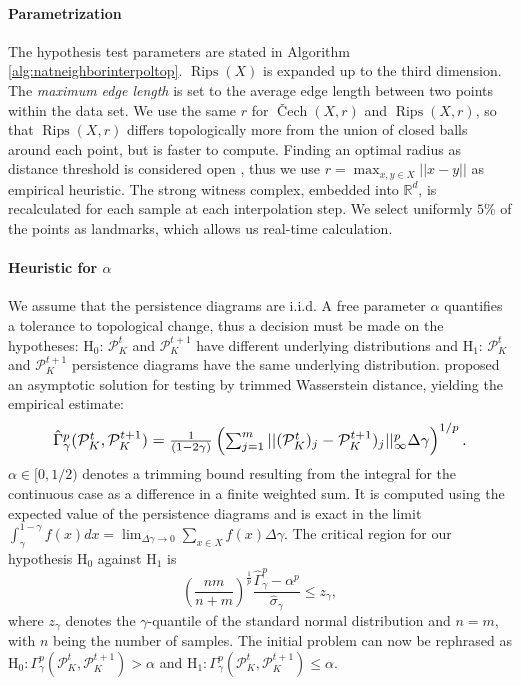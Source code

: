 \documentclass{article}
\DeclareMathOperator{\Cech}{\text{\v{C}ech}}
\DeclareMathOperator{\Rips}{\text{Rips}}
\begin{document}
\paragraph{Parametrization}
The hypothesis test parameters are stated in Algorithm \ref{alg:natneighborinterpoltop}. $\Rips(X)$ is expanded up to the third dimension. The \textit{maximum edge length} is set to the average edge length between two points within the data set. We use the same $r$ for $\Cech(X,r)$ and $\Rips(X,r)$, so that $\Rips(X,r)$ differs topologically more from the union of closed balls around each point, but is faster to compute. Finding an optimal radius as distance threshold is considered open \cite{zomorodian2012topological}, thus we use $r = \max_{x,y \in X} ||x-y||$ as empirical heuristic. The strong witness complex, embedded into $\mathbb{R}^d$, is recalculated for each sample at each interpolation step. We select uniformly $5\%$ of the points as landmarks, which allows us real-time calculation.

\paragraph{Heuristic for $\alpha$} We assume that the persistence diagrams are i.i.d. A free parameter $\alpha$ quantifies a tolerance to topological change, thus a decision must be made on the hypotheses: $\text{H}_0$: $\mathcal{P}_K^t$ and $\mathcal{P}_K^{t+1}$ have different underlying distributions and $\text{H}_1$: $\mathcal{P}_K^t$ and $\mathcal{P}_K^{t+1}$ persistence diagrams have the same underlying distribution. \cite{czado1998assessing} proposed an asymptotic solution for testing by trimmed Wasserstein distance, yielding the empirical estimate:
\begin{equation}
\resizebox{0.88\columnwidth}{!}
{
  $\hat{\Gamma}^p_\gamma(\mathcal{P}^t_K,\mathcal{P}^{t+1}_K) = \frac{1}{(1-2\gamma)} \left( \sum_{j=1}^{m} ||(\mathcal{P}^t_K)_j-\mathcal{P}^{t+1}_K)_j||^p_\infty \Delta \gamma \right)^{1/p}.$
}
\end{equation}
$\alpha \in [0, 1/2)$ denotes a trimming bound resulting from the integral for the continuous case as a difference in a finite weighted sum. It is computed using the expected value of the persistence diagrams and is exact in the limit $\int_\gamma^{1-\gamma} f(x) dx = \lim_{\Delta\gamma \rightarrow 0} \sum_{x \in X} f(x) \Delta \gamma$. The critical region for our hypothesis $\text{H}_0$ against $\text{H}_1$ is
\begin{equation}
\left(\frac{nm}{n+m}\right)^{\frac{1}{p}} \frac{\hat{\Gamma}^p_\gamma - \alpha^p}{\hat{\sigma}_\gamma} \leq z_\gamma,
\end{equation}
where $z_\gamma$ denotes the $\gamma$-quantile of the standard normal distribution and $n=m$, with $n$ being the number of samples. The initial problem can now be rephrased as $\text{H}_0: \Gamma_\gamma^p (\mathcal{P}^t_K,\mathcal{P}^{t+1}_K) > \alpha$ and $\text{H}_1: \Gamma_\gamma^p (\mathcal{P}^t_K,\mathcal{P}^{t+1}_K) \leq \alpha$.
\end{document}
